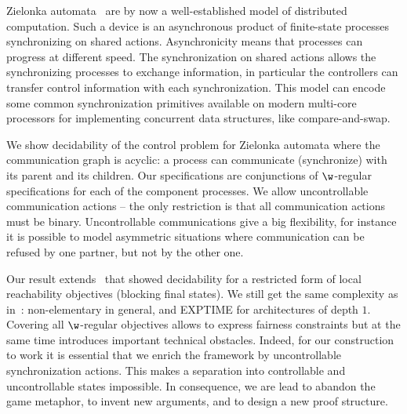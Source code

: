 \documentclass[10pt,a4paper]{article}
\begin{document}
Zielonka automata~\cite{zie87,ms97} are by now a well-established
model of distributed computation. Such a device is an asynchronous
product of finite-state processes synchronizing on shared
actions. Asynchronicity means that processes can progress at different
speed. The synchronization on shared actions allows the synchronizing
processes to exchange information, in particular the controllers can
transfer control information with each synchronization. This model can
encode some common synchronization primitives available on modern
multi-core processors for implementing concurrent data structures, like compare-and-swap.

We show decidability of the control problem for Zielonka automata
where the communication graph is acyclic: a process can communicate
(synchronize) with its parent and its children. Our specifications are
conjunctions of $\w$-regular specifications for each of the component
processes. We allow uncontrollable communication actions -- the only
restriction is that all communication actions must be
binary. Uncontrollable communications give a big flexibility, for
instance it is possible to model asymmetric situations where
communication can be refused by one partner, but not by the other one.

Our result extends~\cite{GGMW13} that  showed decidability for a
restricted form of local reachability objectives (blocking final
states). We still get the same complexity as in~\cite{GGMW13}:
non-elementary in general, and EXPTIME for architectures of depth $1$.
Covering all $\w$-regular objectives allows to express fairness
constraints but at the same time introduces important technical
obstacles. Indeed, for our construction to work it is essential that
we enrich the framework by uncontrollable synchronization actions. This makes a separation into
controllable and uncontrollable states impossible. In consequence, we are lead to abandon the game metaphor, to
invent new arguments, and to design a new proof structure.
\end{document}

